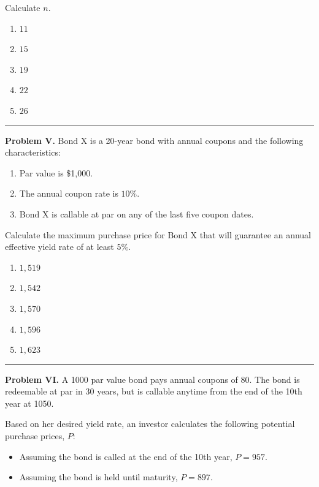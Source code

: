 \documentclass[11pt]{article}
\begin{document}
Calculate \(n\).

\begin{enumerate}[label=\Alph*.]
    \item \(11\)
    \item \(15\)
    \item \(19\)
    \item \(22\)
    \item \(26\)
\end{enumerate}

\medskip
\hrule

\newpage

\textbf{Problem V.} Bond X is a 20-year bond with annual coupons and the following characteristics:

\begin{enumerate}[label=\roman*.]
    \item Par value is \$1{,}000.
    \item The annual coupon rate is \(10\%\).
    \item Bond X is callable at par on any of the last five coupon dates.
\end{enumerate}

Calculate the maximum purchase price for Bond X that will guarantee an annual effective yield rate of at least \(5\%\).

\begin{enumerate}[label=\Alph*.]
    \item \(1{,}519\)
    \item \(1{,}542\)
    \item \(1{,}570\)
    \item \(1{,}596\)
    \item \(1{,}623\)
\end{enumerate}

\medskip
\hrule

\textbf{Problem VI.} A 1000 par value bond pays annual coupons of 80. The bond is redeemable at par in 30 years, but is callable anytime from the end of the 10th year at 1050.

Based on her desired yield rate, an investor calculates the following potential purchase prices, \(P\):

\begin{itemize}
    \item Assuming the bond is called at the end of the 10th year, \(P = 957\).
    \item Assuming the bond is held until maturity, \(P = 897\).
\end{itemize}
\end{document}
